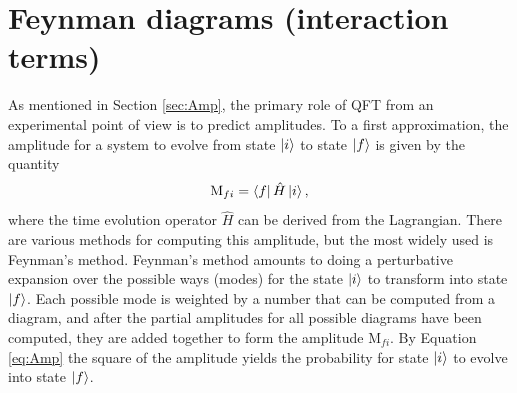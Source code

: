 \section{Feynman diagrams (interaction terms)}
\label{sec:withztwo}
As mentioned in Section \ref{sec:Amp}, the primary role of QFT from an experimental point of view is to predict amplitudes. To a first approximation, the amplitude for a system to evolve from state $\ket{i}$ to state $\ket{f}$ is given by the quantity
\begin{equation}
{\rm M}_{fi}=\bra{f}\hat{H}\ket{i},
\end{equation}
where the time evolution operator $\hat{H}$ can be derived from the Lagrangian. 
There are various methods for computing this amplitude, but the most widely used is Feynman's method. Feynman's method amounts to doing a perturbative expansion over the possible ways (modes) for the state $\ket{i}$ to transform into state $\ket{f}$. Each possible mode is weighted by a number that can be computed from a diagram, and after the partial amplitudes for all possible diagrams have been computed, they are added together to form the amplitude M$_{fi}$. By Equation \ref{eq:Amp} the square of the amplitude yields the probability for state $\ket{i}$ to evolve into state $\ket{f}$.

